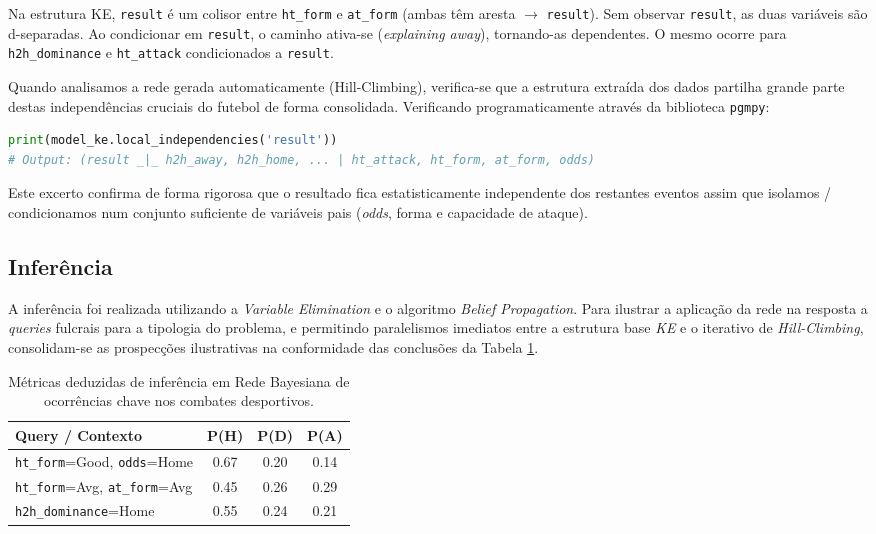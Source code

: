 \documentclass[12pt, a4paper]{article}
\begin{document}
Na estrutura KE, \texttt{result} é um colisor entre \texttt{ht\_form} e \texttt{at\_form} (ambas têm aresta $\rightarrow$ \texttt{result}). Sem observar \texttt{result}, as duas variáveis são d-separadas. Ao condicionar em \texttt{result}, o caminho ativa-se (\textit{explaining away}), tornando-as dependentes. O mesmo ocorre para \texttt{h2h\_dominance} e \texttt{ht\_attack} condicionados a \texttt{result}.

Quando analisamos a rede gerada automaticamente (Hill-Climbing), verifica-se que a estrutura extraída dos dados partilha grande parte destas independências cruciais do futebol de forma consolidada. Verificando programaticamente através da biblioteca \texttt{pgmpy}:

\begin{lstlisting}[language=Python, caption={Exemplo de dependências locais programáticas.}]
print(model_ke.local_independencies('result'))
# Output: (result _|_ h2h_away, h2h_home, ... | ht_attack, ht_form, at_form, odds)
\end{lstlisting}

Este excerto confirma de forma rigorosa que o resultado fica estatisticamente independente dos restantes eventos assim que isolamos / condicionamos num conjunto suficiente de variáveis pais (\textit{odds}, forma e capacidade de ataque).

\subsection{Inferência}

A inferência foi realizada utilizando a \textit{Variable Elimination} e o algoritmo \textit{Belief Propagation}. Para ilustrar a aplicação da rede na resposta a \textit{queries} fulcrais para a tipologia do problema, e permitindo paralelismos imediatos entre a estrutura base \textit{KE} e o iterativo de \textit{Hill-Climbing}, consolidam-se as prospecções ilustrativas na conformidade das conclusões da Tabela \ref{tab:inference_queries}.

\begin{table}[H]
  \centering
  \caption{Métricas deduzidas de inferência em Rede Bayesiana de ocorrências chave nos combates desportivos.}
  \begin{tabular}{lccc}
    \toprule
    \textbf{Query / Contexto} & \textbf{P(H)} & \textbf{P(D)} & \textbf{P(A)} \\
    \midrule
    \texttt{ht\_form}=Good, \texttt{odds}=Home & 0.67 & 0.20 & 0.14 \\
    \texttt{ht\_form}=Avg, \texttt{at\_form}=Avg & 0.45 & 0.26 & 0.29 \\
    \texttt{h2h\_dominance}=Home & 0.55 & 0.24 & 0.21 \\
    \bottomrule
  \end{tabular}
  \label{tab:inference_queries}
\end{table}
\end{document}
